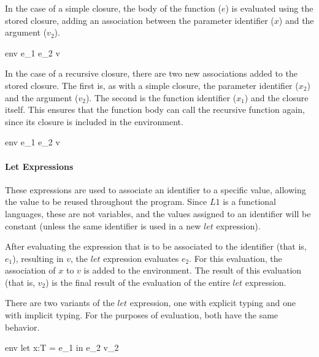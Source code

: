 \documentclass{article}
\begin{document}
\smallskip

In the case of a simple closure, the body of the function ($e$) is evaluated using the stored closure, 
adding an association between the parameter identifier ($x$) and the argument ($v_2$).

	{\mbox{env} \vdash e_1 \; e_2 \Downarrow v}
	
In the case of a recursive closure, there are two new associations added to the stored closure.
The first is, as with a simple closure, the parameter identifier ($x_2$) and the argument ($v_2$).
The second is the function identifier ($x_1$) and the closure itself.
This ensures that the function body can call the recursive function again, since its closure is included in the environment.

	{\mbox{env} \vdash e_1 \; e_2 \Downarrow v}
		
\paragraph{Let Expressions}
These expressions are used to associate an identifier to a specific value, allowing the value to be reused throughout the program.
Since $L1$ is a functional languages, these are not variables, and the values assigned to an identifier will be constant (unless the same identifier is used in a new $let$ expression).

After evaluating the expression that is to be associated to the identifier (that is, $e_1$), resulting in $v$, the $let$ expression evaluates $e_2$.
For this evaluation, the association of $x$ to $v$ is added to the environment.
The result of this evaluation (that is, $v_2$) is the final result of the evaluation of the entire $let$ expression.

There are two variants of the $let$ expression, one with explicit typing and one with implicit typing.
For the purposes of evaluation, both have the same behavior.

	{\mbox{env} \vdash let \; x:T = e_1 \; in \; e_2 \Downarrow v_2}
	
\end{document}
